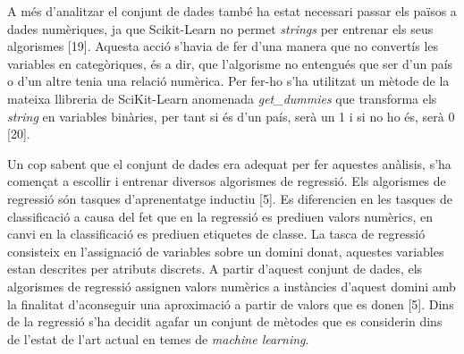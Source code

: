 \documentclass[10pt,a4paper,twocolumn,twoside]{article}
\begin{document}
A més d'analitzar el conjunt de dades també ha estat necessari passar els països a dades numèriques, ja que Scikit-Learn no permet \textit{strings} per entrenar els seus algorismes [19]. Aquesta acció s'havia de fer d'una manera que no convertís les variables en categòriques, és a dir, que l'algorisme no entengués que ser d'un país o d'un altre tenia una relació numèrica. Per fer-ho s'ha utilitzat un mètode de la mateixa llibreria de SciKit-Learn anomenada \textit{get\_dummies} que transforma els \textit{string} en variables binàries, per tant si és d'un país, serà un 1 i si no ho és, serà 0 [20].

Un cop sabent que el conjunt de dades era adequat per fer aquestes anàlisis, s'ha començat a escollir i entrenar diversos algorismes de regressió. Els algorismes de regressió són tasques d'aprenentatge inductiu [5]. Es diferencien en les tasques de classificació a causa del fet que en la regressió es prediuen valors numèrics, en canvi en la classificació es prediuen etiquetes de classe. La tasca de regressió consisteix en l'assignació de variables sobre un domini donat, aquestes variables estan descrites per atributs discrets. A partir d'aquest conjunt de dades, els algorismes de regressió assignen valors numèrics a instàncies d'aquest domini amb la finalitat d'aconseguir una aproximació a partir de valors que es donen [5]. Dins de la regressió s'ha decidit agafar un conjunt de mètodes que es considerin dins de l'estat de l'art actual en temes de \textit{machine learning}.
\end{document}
